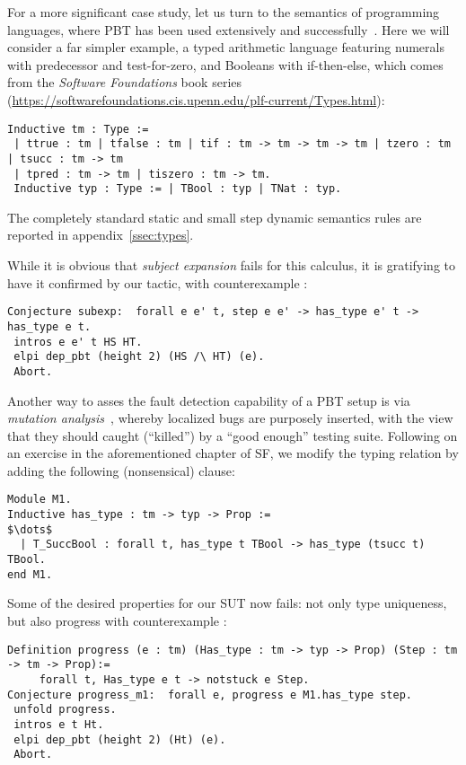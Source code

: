 
For a more significant case study, let us turn to the semantics of
programming languages, where PBT has been used extensively and
successfully~\cite{Klein12}. Here we will consider a far simpler example,
a typed arithmetic language featuring numerals with predecessor  and test-for-zero, 
and Booleans with if-then-else, which comes from the \emph{Software Foundations} book series (\url{https://softwarefoundations.cis.upenn.edu/plf-current/Types.html}):
\begin{lstlisting}
Inductive tm : Type :=
 | ttrue : tm | tfalse : tm | tif : tm -> tm -> tm -> tm | tzero : tm | tsucc : tm -> tm
 | tpred : tm -> tm | tiszero : tm -> tm.
 Inductive typ : Type := | TBool : typ | TNat : typ.
\end{lstlisting}
The completely standard static and small step dynamic semantics rules are
reported in appendix~\ref{ssec:types}.

While it is obvious that \emph{subject expansion} fails for this calculus, it is gratifying to have it confirmed by our tactic, with counterexample :
\begin{lstlisting}
Conjecture subexp:  forall e e' t, step e e' -> has_type e' t -> has_type e t. 
 intros e e' t HS HT.
 elpi dep_pbt (height 2) (HS /\ HT) (e).
 Abort.
\end{lstlisting}


Another way to asses the fault detection capability of a PBT setup is via \emph{mutation analysis}~\cite{CavadaCM20}, whereby localized bugs are purposely inserted, with the view that they should caught (``killed'') by a ``good enough'' testing suite. Following on  an exercise in the aforementioned chapter of SF, we modify the typing relation by adding the following (nonsensical)  clause:

\begin{lstlisting}
Module M1.
Inductive has_type : tm -> typ -> Prop :=
$\dots$
  | T_SuccBool : forall t, has_type t TBool -> has_type (tsucc t) TBool.
end M1.
\end{lstlisting}
Some of the desired properties for our SUT now fails: not
only type uniqueness, but also progress with counterexample :
\begin{lstlisting}
Definition progress (e : tm) (Has_type : tm -> typ -> Prop) (Step : tm -> tm -> Prop):= 
     forall t, Has_type e t -> notstuck e Step.
Conjecture progress_m1:  forall e, progress e M1.has_type step.
 unfold progress.
 intros e t Ht.    
 elpi dep_pbt (height 2) (Ht) (e).
 Abort.
\end{lstlisting}

